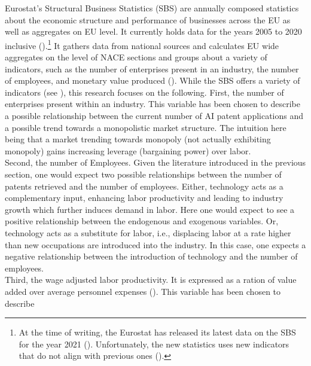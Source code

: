 \documentclass[
  11,
  a4paperpaper,
]{article}
\begin{document}
Eurostat's Structural Business Statistics (SBS) are annually composed
statistics about the economic structure and performance of businesses
across the EU as well as aggregates on EU level. It currently holds data
for the years 2005 to 2020 inclusive
().\footnote{At the time of writing, the
  Eurostat has released its latest data on the SBS for the year 2021
  ().
  Unfortunately, the new statistics uses new indicators that do not
  align with previous ones
  ().} It gathers data from national sources and
calculates EU wide aggregates on the level of NACE sections and groups
about a variety of indicators, such as the number of enterprises present
in an industry, the number of employees, and monetary value produced
(). While the SBS offers a variety of indicators (see
),
this research focuses on the following. First, the number of enterprises
present within an industry. This variable has been chosen to describe a
possible relationship between the current number of AI patent
applications and a possible trend towards a monopolistic market
structure. The intuition here being that a market trending towards
monopoly (not actually exhibiting monopoly) gains increasing leverage
(bargaining power) over labor.\\
Second, the number of Employees. Given the literature introduced in the
previous section, one would expect two possible relationships between
the number of patents retrieved and the number of employees. Either,
technology acts as a complementary input, enhancing labor productivity
and leading to industry growth which further induces demand in labor.
Here one would expect to see a positive relationship between the
endogenous and exogenous variables. Or, technology acts as a substitute
for labor, i.e., displacing labor at a rate higher than new occupations
are introduced into the industry. In this case, one expects a negative
relationship between the introduction of technology and the number of
employees.\\
Third, the wage adjusted labor productivity. It is expressed as a ration
of value added over average personnel expenses
(). This variable has been chosen to describe
\end{document}
